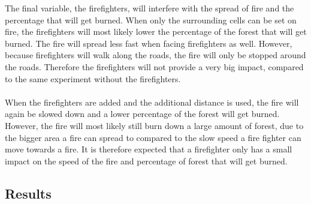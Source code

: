 \documentclass{article}
\begin{document}
\begin{multicols}{2}
The final variable, the firefighters, will interfere with the spread of fire and the percentage that will get burned. When only the surrounding cells can be set on fire, the firefighters will most likely lower the percentage of the forest that will get burned. The fire will spread less fast when facing firefighters as well. However, because firefighters will walk along the roads, the fire will only be stopped around the roads. Therefore the firefighters will not provide a very big impact, compared to the same experiment without the firefighters.\\\\
When the firefighters are added and the additional distance is used, the fire will again be slowed down and a lower percentage of the forest will get burned. However, the fire will most likely still burn down a large amount of forest, due to the bigger area a fire can spread to compared to the slow speed a fire fighter can move towards a fire. It is therefore expected that a firefighter only has a small impact on the speed of the fire and percentage of forest that will get burned.


\subsection*{Results}

\end{multicols}
\end{document}
